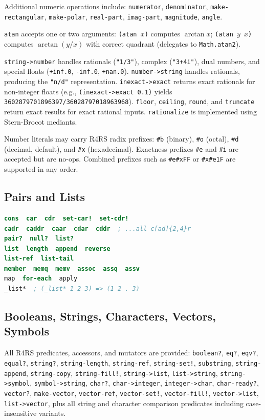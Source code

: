 \documentclass[12pt]{report}
\begin{document}
Additional numeric operations include: {\tt numerator},
{\tt denominator}, {\tt make-rectangular}, {\tt make-polar},
{\tt real-part}, {\tt imag-part}, {\tt magnitude}, {\tt angle}.

{\tt atan} accepts one or two arguments: {\tt (atan $x$)} computes
$\arctan x$; {\tt (atan $y$ $x$)} computes $\arctan(y/x)$ with
correct quadrant (delegates to {\tt Math.atan2}).

{\tt string->number} handles rationals ({\tt "1/3"}), complex
({\tt "3+4i"}), dual numbers, and special floats ({\tt +inf.0},
{\tt -inf.0}, {\tt +nan.0}).  {\tt number->string} handles rationals,
producing the {\tt "n/d"} representation.  {\tt inexact->exact} returns
exact rationals for non-integer floats (e.g., {\tt (inexact->exact 0.1)}
yields {\tt 3602879701896397/36028797018963968}).
{\tt floor}, {\tt ceiling}, {\tt round}, and {\tt truncate} return
exact results for exact rational inputs.  {\tt rationalize} is
implemented using Stern-Brocot mediants.

Number literals may carry R4RS radix prefixes: {\tt \#b} (binary),
{\tt \#o} (octal), {\tt \#d} (decimal, default), and {\tt \#x}
(hexadecimal).  Exactness prefixes {\tt \#e} and {\tt \#i} are
accepted but are no-ops.  Combined prefixes such as {\tt \#e\#xFF} or
{\tt \#x\#e1F} are supported in any order.

\subsection{Pairs and Lists}

\begin{lstlisting}[language=Scheme]
cons  car  cdr  set-car!  set-cdr!
cadr  caddr  caar  cdar  cddr  ; ...all c[ad]{2,4}r
pair?  null?  list?
list  length  append  reverse
list-ref  list-tail
member  memq  memv  assoc  assq  assv
map  for-each  apply
_list*  ; (_list* 1 2 3) => (1 2 . 3)
\end{lstlisting}

\subsection{Booleans, Strings, Characters, Vectors, Symbols}

All R4RS predicates, accessors, and mutators are provided:
{\tt boolean?}, {\tt eq?}, {\tt eqv?}, {\tt equal?},
{\tt string?}, {\tt string-length}, {\tt string-ref}, {\tt string-set!},
{\tt substring}, {\tt string-append}, {\tt string-copy}, {\tt string-fill!},
{\tt string->list}, {\tt list->string},
{\tt string->symbol}, {\tt symbol->string},
{\tt char?}, {\tt char->integer}, {\tt integer->char}, {\tt char-ready?},
{\tt vector?}, {\tt make-vector}, {\tt vector-ref}, {\tt vector-set!},
{\tt vector-fill!}, {\tt vector->list}, {\tt list->vector},
plus all string and character comparison predicates including
case-insensitive variants.
\end{document}
